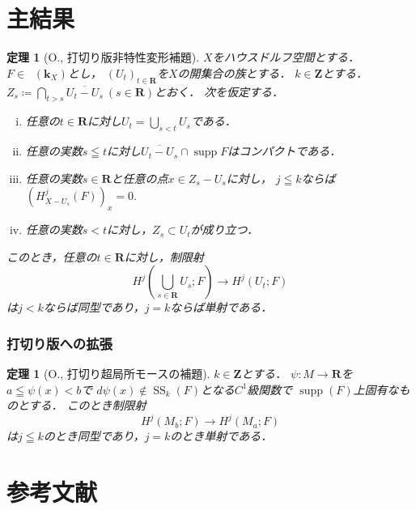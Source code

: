 \documentclass[dvipdfmx,10pt,aspectratio=169,leqno]{beamer}%
\newcommand{\zz}{\mathbf{Z}}
\newcommand{\rr}{\mathbf{R}}
\newcommand{\kk}{\mathbf{k}}
\numberwithin{equation}{subsection}
\newcommand{\supp}{\mathop{\mathrm{supp}}\nolimits}
\newcommand{\Dompl}{\mathop{\mathsf{D}^\mathrm{+}}\nolimits}
\newcommand{\muS}[1][]{\mathop{\mathrm{SS}}\nolimits_{#1}}
\theoremstyle{mystyle}
\newtheorem{THM}[AXM]{定理}
\begin{document}
\section{主結果}
\begin{frame}
  \begin{THM}[O., 打切り版非特性変形補題]
    \(X\)をハウスドルフ空間とする．
    \(F\in\Dompl(\kk_X)\)とし，
    \(\left(U_{t}\right)_{t\in\rr}\)を\(X\)の開集合の族とする．
    \(k\in\zz\)とする．
    \(
      Z_{s}\coloneqq \bigcap_{t>s}\overline{U_t- U_s}\ (s\in\rr)
    \)とおく．
    次を仮定する．%
    \begin{enumerate}[(i)]
      \setlength{\leftskip}{10pt}
      \item \label{item:t-nonchar1}
      任意の\(t\in\rr\)に対し\(U_{t}=\bigcup_{s<t}U_{s}\)である．
      \item \label{item:t-nonchar2}
      任意の実数\(s\leqq t\)に対し\(
        \overline{U_{t}- U_{s}}\cap \supp{F}
      \)はコンパクトである．
      \item \label{item:t-nonchar3}
      任意の実数\(s\in\rr\)と任意の点\(x\in Z_{s}- U_{s}\)に対し，
      \(j\leqq k\)ならば
      \(
        (H^{j}_{X- U_{s}}(F))_{x}=0. 
      \)
      \item \label{item:t-nonchar4} 
      任意の実数\(s< t\)に対し，\(Z_s\subset U_{t}\)が成り立つ．
    \end{enumerate}
    このとき，任意の\(t\in\rr\)に対し，制限射\[
      H^{j}\left(\bigcup_{s\in\rr}U_{s};F\right)
      \to
      H^{j}\left(U_{t};F\right)
    \]は\(j<k\)ならば同型であり，\(j=k\)ならば単射である．
  \end{THM}
\end{frame}

\begin{frame}
    \frametitle{打切り版への拡張}
    \begin{THM}[O., 打切り超局所モースの補題]
        \(k\in\zz\)とする．
        \(\psi\colon M\to \rr\)を\(a\leqq\psi(x)< b\)で
        \(d\psi(x)\notin\muS[k](F)\)となる\(C^1\)級関数で
        \(\supp(F)\)上固有なものとする．
        このとき制限射\[
            H^{j}(M_b;F)\longrightarrow H^{j}(M_a;F)
        \]は\(j\leqq k\)のとき同型であり，\(j=k\)のとき単射である．
    \end{THM}    
\end{frame}


\appendix
\section*{参考文献}
\end{document}
